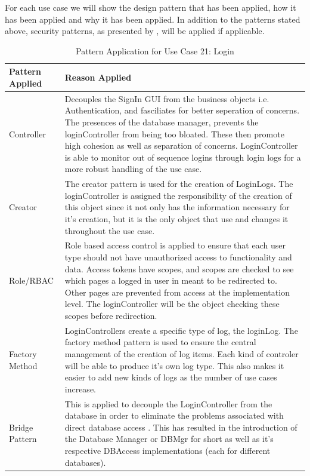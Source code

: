 \documentclass[11pt]{article}
\begin{document}
For each use case we will show the design pattern that has been applied, how it has been applied and why it has been applied. 
In addition to the patterns stated above, security patterns, as presented by \cite{Book:1}, will be applied if applicable.
\begin{table}[H]
	\centering
	\begin{tabular}{|p{5cm}|p{10cm}|}
		\hline 
		Pattern Applied & Reason Applied \\
		\hline
		Controller & Decouples the SignIn GUI from the business objects i.e. Authentication, and fasciliates for better seperation of concerns. The presences of the database manager, prevents the loginController from being too bloated. These then promote high cohesion as well as separation of concerns. LoginController is able to monitor out of sequence logins through login logs for a more robust handling of the use case.\cite{Book:1}\\
		\hline
		Creator & The creator pattern is used for the creation of LoginLogs. The loginController is assigned the responsibility of the creation of this object since it not only has the information necessary for it's creation, but it is the only object that use and changes it throughout the use case.\cite{Book:1}\\
		\hline
		Role/RBAC & Role based access control is applied to ensure that each user type should not have unauthorized access to functionality and data. Access tokens have scopes, and scopes are checked to see which pages a logged in user in meant to be redirected to. Other pages are prevented from access at the implementation level.\cite{Book:1} The loginController will be the object checking these scopes before redirection.\\
		\hline
		Factory Method & LoginControllers create a specific type of log, the loginLog. The factory method pattern is used to ensure the central management of the creation of log items. Each kind of controler will be able to produce it's own log type. This also makes it easier to add new kinds of logs as the number of use cases increase.\\
		\hline
		Bridge Pattern & This is applied to decouple the LoginController from the database in order to eliminate the problems associated with direct database access \cite{Book:1}. This has resulted in the introduction of the Database Manager or DBMgr for short as well as it's respective DBAccess implementations (each for different databases).\\
		\hline
	\end{tabular}
	\caption{Pattern Application for Use Case 21: Login}
\end{table}
 
\end{document}
